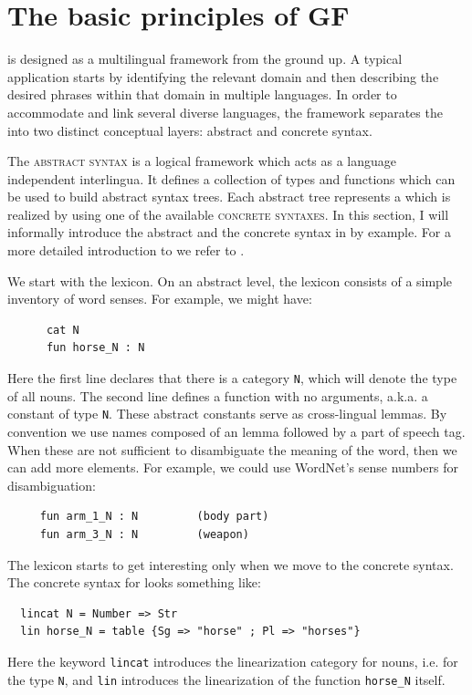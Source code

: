 \documentclass[output=paper]{langsci/langscibook}
\begin{document}
\section{The basic principles of GF}

 is designed as a multilingual framework from the ground up.
A typical application starts by identifying the relevant
domain and then describing the desired phrases within that domain
in multiple languages. In order to accommodate and link several
diverse languages, the framework separates the  into two distinct
conceptual layers: abstract and concrete syntax.

The \textsc{abstract syntax} is a logical framework which acts as a language independent interlingua. It defines a collection of types and functions which can be used to build abstract syntax trees. Each abstract tree represents a  which is realized by using one of the available \textsc{concrete syntaxes}. In this section, I will informally introduce the abstract and the concrete syntax in  by example. For a more detailed introduction to  we refer to \cite{ranta-2011}.

We start with the lexicon. On an abstract level, the lexicon consists of a simple inventory of word senses. For example, we might have:
\begin{verbatim}
      cat N
      fun horse_N : N
\end{verbatim}
Here the first line declares that there is a category \verb=N=, which will denote the type of all nouns. The second line defines a function with no arguments, a.k.a. a constant of type \verb=N=. These abstract constants serve as cross-lingual lemmas. By convention we use names composed of an  lemma followed by a part of speech tag. When these are not sufficient to disambiguate the meaning of the word, then we can add more elements. For example, we could use WordNet's sense numbers for disambiguation:
\begin{verbatim}
     fun arm_1_N : N         (body part)
     fun arm_3_N : N         (weapon)
\end{verbatim}

The lexicon starts to get interesting only when we move to 
the concrete syntax. The concrete syntax for  
looks something like:
\begin{verbatim}
  lincat N = Number => Str
  lin horse_N = table {Sg => "horse" ; Pl => "horses"}
\end{verbatim}
Here the keyword \verb=lincat= introduces the linearization category 
for nouns, i.e. for the type \verb=N=, and \verb=lin= introduces 
the linearization of the function \verb=horse_N= itself.
\end{document}
